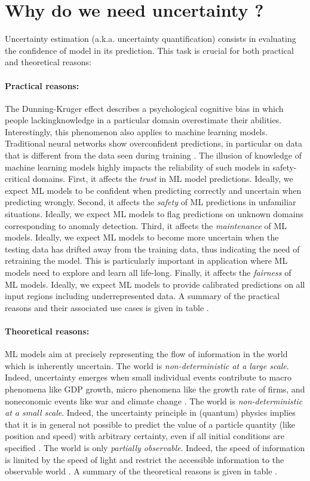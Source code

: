\section{Why do we need uncertainty ?}

Uncertainty estimation (a.k.a. uncertainty quantification) consists in evaluating the confidence of model in its prediction. This task is crucial for both practical and theoretical reasons:

\paragraph*{Practical reasons:} The Dunning-Kruger effect  describes a psychological cognitive bias in which people lackingknowledge in a particular domain overestimate their abilities. Interestingly, this phenomenon also applies to machine learning models. Traditional neural networks show overconfident predictions, in particular on data that is different from the data seen during training . The illusion of knowledge of machine learning models highly impacts the reliability of such  models  in  safety-critical  domains. 
First, it affects the \emph{trust} in ML model predictions. Ideally, we expect ML models to be confident when predicting correctly and uncertain when predicting wrongly. 
Second, it affects the \emph{safety} of ML predictions in unfamiliar situations. Ideally, we expect ML models to flag predictions on unknown domains corresponding to anomaly detection.
Third, it affects the \emph{maintenance} of ML models. Ideally, we expect ML models to become more uncertain when the testing data has drifted away from the training data, thus indicating the need of retraining the model. This is particularly important in application where ML models need to explore and learn all life-long.
Finally, it affects the \emph{fairness} of ML models. Ideally, we expect ML models to provide calibrated predictions on all input regions including underrepresented data.
A summary of the practical reasons and their associated use cases is given in table .

\paragraph*{Theoretical reasons:} ML models aim at precisely representing the flow of information in the world which is inherently uncertain.
The world is \emph{non-deterministic at a large scale}. Indeed, uncertainty emerges when small individual events contribute to macro phenomena like GDP growth, micro phenomena like the growth rate of firms, and noneconomic events like war and climate change \cite{macro-micro-uncertainty}.
The world is \emph{non-deterministic at a small scale}. Indeed, the uncertainty principle in (quantum) physics implies that it is in general not possible to predict the value of a particle quantity (like position and speed) with arbitrary certainty, even if all initial conditions are specified .
The world is only \emph{partially observable}. Indeed, the speed of information is limited by the speed of light and restrict the accessible information to the observable world .
A summary of the theoretical reasons is given in table .

